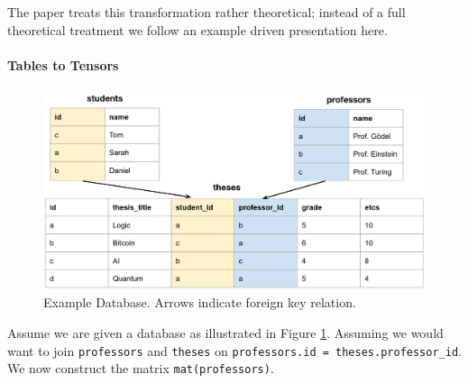 \documentclass{paper}
\begin{document}
	The paper \cite{hu2021tcudb} treats this transformation rather theoretical; instead of a full theoretical treatment we follow an example driven presentation here.
	
	\paragraph{Tables to Tensors}
	
	\begin{figure}
	\centering
	\includegraphics[width=0.9\linewidth]{schema1}
	\caption{Example Database. Arrows indicate foreign key relation.}
	\label{fig:schema1}
	\end{figure}


	Assume we are given a database as illustrated in Figure \ref{fig:schema1}. Assuming we would want to join \texttt{professors} and \texttt{theses} on \texttt{professors.id = theses.professor\_id}. We now construct the matrix \texttt{mat(professors)}.
	
\end{document}
